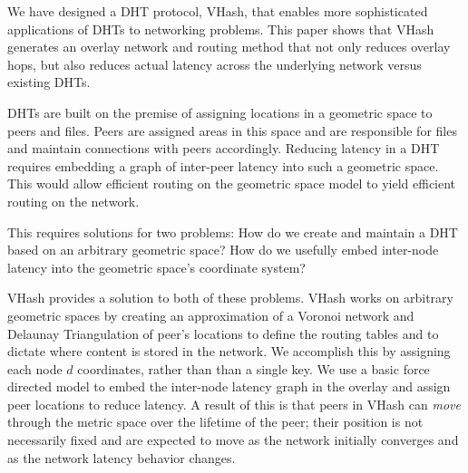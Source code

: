 \documentclass[10pt, conference, letterpaper]{IEEEtran}
\begin{document}
 
We have designed a DHT protocol, VHash, that enables more sophisticated applications of DHTs to networking problems.
This paper shows that VHash generates an overlay network and routing method that not only reduces overlay hops, but also reduces actual latency across the underlying network versus existing DHTs.

DHTs are built on the premise of assigning locations in a geometric space to peers and files.
Peers are assigned areas in this space and are responsible for files and maintain connections with peers accordingly.
Reducing latency in a DHT requires embedding a graph of inter-peer latency into such a geometric space.
This would allow efficient routing on the geometric space model to yield efficient routing on the network.

This requires solutions for two problems:
How do we create and maintain a DHT based on an arbitrary geometric space?
How do we usefully embed inter-node latency into the geometric space's coordinate system?

VHash provides a solution to both of these problems.
VHash works on arbitrary geometric spaces by creating an approximation of a Voronoi network and Delaunay Triangulation of peer's locations to define the routing tables and to dictate where content is stored in the network.
We accomplish this by assigning each node $d$ coordinates, rather than than a single key.
We use a basic force directed model to embed the inter-node latency graph in the overlay and assign peer locations to reduce latency.
A result of this is that peers in VHash  can \emph{move} through the metric space over the lifetime of the peer;  their position is not necessarily fixed and are expected to move as the network initially converges and as the network latency behavior changes.
\end{document}
